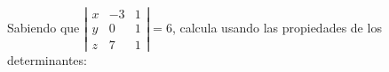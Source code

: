 \documentclass[addpoints,spanish, 12pt,a4paper]{exam}
\begin{document}
\begin{questions}
\begin{parts}
\end{parts}

\question Sabiendo que $\left|\begin{matrix}x & -3 & 1\\y & 0 & 1\\z & 7 & 1\end{matrix}\right|=6$, calcula usando las propiedades de los determinantes:
\begin{parts}

\end{parts}
\end{questions}
\end{document}

